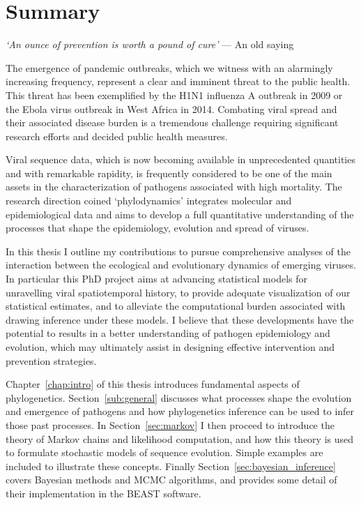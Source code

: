 
\chapter*{Summary}

\bigskip{}

\emph{`An ounce of prevention is worth a pound of cure'}
--- An old saying

\bigskip{}

The emergence of pandemic outbreaks, which we witness with an alarmingly increasing frequency, represent a clear and imminent threat to the public health. 
This threat has been exemplified by the H1N1 influenza A outbreak in 2009 or the Ebola virus outbreak in West Africa in 2014.
Combating viral spread and their associated disease burden is a tremendous challenge requiring significant research efforts and decided public health measures. 

Viral sequence data, which is now becoming available in unprecedented quantities and with remarkable rapidity, is frequently considered to be one of the main assets in the characterization of pathogens associated with high mortality. 
The research direction coined `phylodynamics' integrates molecular and epidemiological data and aims to develop a full quantitative understanding  of the processes that shape the epidemiology, evolution and spread of viruses.

In this thesis I outline my contributions to pursue comprehensive analyses of the interaction between the ecological and evolutionary dynamics of emerging viruses.
In particular this PhD project aims at advancing statistical models for unravelling viral spatiotemporal history, to provide adequate visualization of our statistical estimates, and to alleviate the computational burden associated with drawing inference under these models.
I believe that these developments have the potential to results in a better understanding of pathogen epidemiology and evolution, which may ultimately assist in designing effective intervention and prevention strategies. 

Chapter~\ref{chap:intro} of this thesis introduces fundamental aspects of phylogenetics.
Section~\ref{sub:general} discusses what processes shape the evolution and emergence of pathogens and how phylogenetics inference can be used to infer those past processes.
In Section~\ref{sec:markov} I then proceed to introduce the theory of Markov chains and likelihood computation, and how this theory is used to formulate stochastic models of sequence evolution. 
Simple examples are included to illustrate these concepts.
Finally Section~\ref{sec:bayesian_inference} covers Bayesian methods and MCMC algorithms, and provides some detail of their implementation in the BEAST software.

